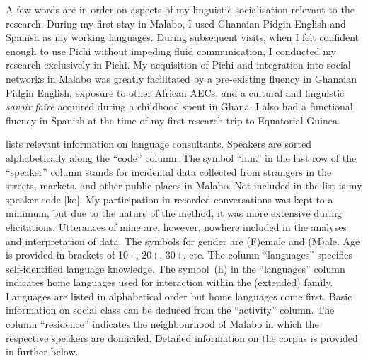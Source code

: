 A few words are in order on aspects of my linguistic socialisation relevant to the research. During my first stay in Malabo, I used Ghanaian Pidgin English and Spanish as my working languages. During subsequent visits, when I felt confident enough to use Pichi without impeding fluid communication, I conducted my research exclusively in Pichi. My acquisition of Pichi and integration into social networks in Malabo was greatly facilitated by a pre-existing fluency in Ghanaian Pidgin English, exposure to other African AECs, and a cultural and linguistic \textit{savoir} \textit{faire} acquired during a childhood spent in Ghana. I also had a  functional fluency in Spanish at the time of my first research trip to Equatorial Guinea.


 lists relevant information on language consultants. Speakers are sorted alphabetically along the “code” column. The symbol “n.n.” in the last row of the “speaker” column stands for incidental data collected from strangers in the streets, markets, and other public places in Malabo. Not included in the list is my speaker code [ko]. My participation in recorded conversations was kept to a minimum, but due to the nature of the method, it was more extensive during elicitations. Utterances of mine are, however, nowhere included in the analyses and interpretation of data. The symbols for gender are (\textsc{F})emale and (M)ale. Age is provided in brackets of 10+, 20+, 30+, etc. The column “languages” specifies self-identified language knowledge. The symbol~(h) in the “languages” column indicates home languages used for interaction within the (extended) family. Languages are listed in alphabetical order but home languages come first. Basic information on social class can be deduced from the “activity” column. The column “residence” indicates the neighbourhood of Malabo in which the respective speakers are domiciled. Detailed information on the corpus is provided in  further below.


